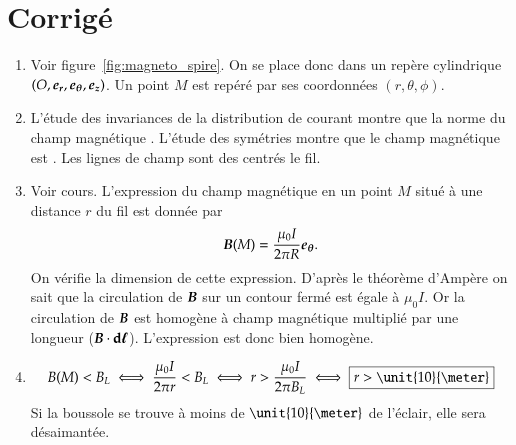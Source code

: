 \section{Corrigé}
\begin{corrige}
\begin{enumerate}
\item Voir figure~\ref{fig:magneto_spire}. On se place donc dans un repère cylindrique
      $(O, \er, \etheta, \ez)$. Un point $M$ est repéré par ses coordonnées 
      $(r, \theta, \phi)$.

\item  L'étude
      des invariances de la distribution de courant montre que la norme du 
      champ magnétique . L'étude des
      symétries montre que le champ magnétique est .
      Les lignes de champ sont des  centrés le fil.

\item Voir cours. L'expression du champ magnétique en un point $M$ situé 
  à une distance $r$ du fil est donnée par
  \begin{equation*}
	  \vecb(M) = \dfrac{\mu_0 I}{2 \pi R} \etheta.
   \end{equation*}
   On vérifie la dimension de cette expression. D'après le théorème d'Ampère
   on sait que la circulation de $\vecb$ sur un contour fermé est égale à 
   $\mu_0 I$. Or la circulation de $\vecb$ est homogène à champ magnétique 
   multiplié par une longueur ($\vecb \cdot \dl$). L'expression est donc bien homogène.

   \item 
	   \begin{equation*}
		B(M) < B_L \iff \dfrac{\mu_0 I}{2 \pi r} < B_L \iff 
		r > \dfrac{\mu_0 I}{2 \pi B_L} \iff \boxed{r > \unit{10}{\meter}} 
	   \end{equation*}
	Si la boussole se trouve à moins de $\unit{10}{\meter}$ de l'éclair, 
	elle sera désaimantée.
\end{enumerate}
\end{corrige}

